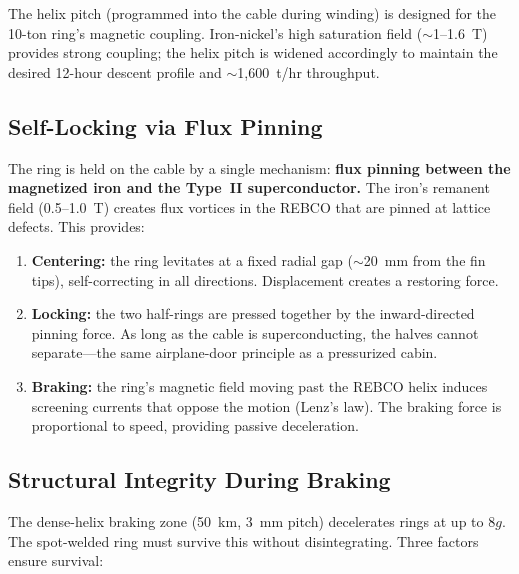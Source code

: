 \documentclass[12pt,letterpaper]{article}
\begin{document}
\noindent The helix pitch (programmed into the cable during winding) is designed for the 10-ton ring's magnetic coupling. Iron-nickel's high saturation field (${\sim}$1--1.6~T) provides strong coupling; the helix pitch is widened accordingly to maintain the desired 12-hour descent profile and ${\sim}$1,600~t/hr throughput.

\subsection{Self-Locking via Flux Pinning}

The ring is held on the cable by a single mechanism: \textbf{flux pinning between the magnetized iron and the Type~II superconductor.} The iron's remanent field (0.5--1.0~T) creates flux vortices in the REBCO that are pinned at lattice defects. This provides:

\begin{enumerate}[label=(\roman*)]
\item \textbf{Centering:} the ring levitates at a fixed radial gap (${\sim}$20~mm from the fin tips), self-correcting in all directions. Displacement creates a restoring force.
\item \textbf{Locking:} the two half-rings are pressed together by the inward-directed pinning force. As long as the cable is superconducting, the halves cannot separate---the same airplane-door principle as a pressurized cabin.
\item \textbf{Braking:} the ring's magnetic field moving past the REBCO helix induces screening currents that oppose the motion (Lenz's law). The braking force is proportional to speed, providing passive deceleration.
\end{enumerate}

\subsection{Structural Integrity During Braking}

The dense-helix braking zone (50~km, 3~mm pitch) decelerates rings at up to 8$g$. The spot-welded ring must survive this without disintegrating. Three factors ensure survival:
\end{document}
